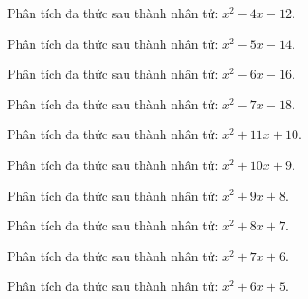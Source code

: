 \begin{bt}
	Phân tích đa thức sau thành nhân tử: $x^2 - 4 x - 12$.
\end{bt}
\begin{bt}
	Phân tích đa thức sau thành nhân tử: $x^2 - 5 x - 14$.
\end{bt}
\begin{bt}
	Phân tích đa thức sau thành nhân tử: $x^2 - 6 x - 16$.
\end{bt}
\begin{bt}
	Phân tích đa thức sau thành nhân tử: $x^2 - 7 x - 18$.
\end{bt}
\begin{bt}
	Phân tích đa thức sau thành nhân tử: $x^2 + 11 x + 10$.
\end{bt}
\begin{bt}
	Phân tích đa thức sau thành nhân tử: $x^2 + 10 x + 9$.
\end{bt}
\begin{bt}
	Phân tích đa thức sau thành nhân tử: $x^2 + 9 x + 8$.
\end{bt}
\begin{bt}
	Phân tích đa thức sau thành nhân tử: $x^2 + 8 x + 7$.
\end{bt}
\begin{bt}
	Phân tích đa thức sau thành nhân tử: $x^2 + 7 x + 6$.
\end{bt}
\begin{bt}
	Phân tích đa thức sau thành nhân tử: $x^2 + 6 x + 5$.
\end{bt}
